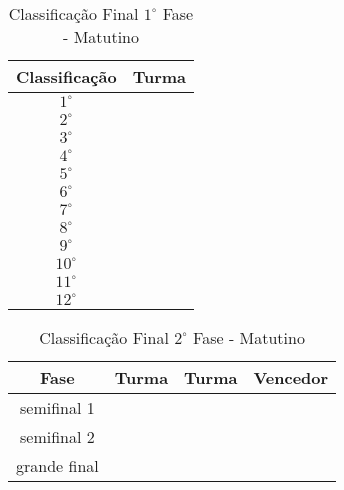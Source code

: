 \documentclass[10pt]{article}
\begin{document}
    \begin{table}[H]
        \caption{Classificação Final $1^\circ$ Fase - Matutino}
        \label{tab:tab-matutino}
        \begin{center}
            \begin{tabular}{|c|c|}
                \hline
                \textbf{Classificação} & \textbf{Turma}\\ \hline
                $1^\circ$ & \\ \hline
                $2^\circ$ & \\ \hline
                $3^\circ$ & \\ \hline
                $4^\circ$ & \\ \hline
                $5^\circ$ & \\ \hline
                $6^\circ$ & \\ \hline
                $7^\circ$ & \\ \hline
                $8^\circ$ & \\ \hline
                $9^\circ$ & \\ \hline
                $10^\circ$ & \\ \hline
                $11^\circ$ & \\ \hline
                $12^\circ$ & \\ \hline
            \end{tabular}
        \end{center}
    \end{table}

    \begin{table}[H]
        \caption{Classificação Final $2^\circ$ Fase - Matutino}
        \label{tab:tab-matutino}
        \begin{center}
            \begin{tabular}{|c|c|c|c|}
                \hline
                \textbf{Fase} & \textbf{Turma} & \textbf{Turma} & \textbf{Vencedor}\\ \hline
                semifinal 1 & & & \\ \hline
                semifinal 2 & & & \\ \hline
                grande final & & & \\ \hline

            \end{tabular}
        \end{center}
    \end{table}
\end{document}
